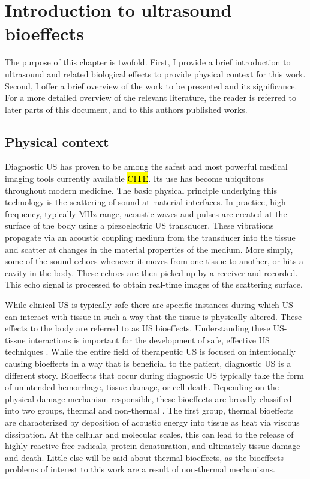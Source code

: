 \chapter{Introduction to ultrasound bioeffects} \label{ch:usbe_intro}%
The purpose of this chapter is twofold. First, I provide a brief
introduction to ultrasound and related biological effects to provide
physical context for this work. Second, I offer a brief overview of
the work to be presented and its significance. For a more detailed
overview of the relevant literature, the reader is referred to later
parts of this document, and to this authors published works.

\section{Physical context} \label{sec:usbe_intro_physical_context}%
Diagnostic \ac{US} has proven to be among the safest and most powerful
medical imaging tools currently available \hl{CITE}. Its use has become
ubiquitous throughout modern medicine. The basic physical principle
underlying this technology is the scattering of sound at material
interfaces. In practice, high-frequency, typically MHz range, acoustic
waves and pulses are created at the surface of the body using a
piezoelectric \ac{US} transducer. These vibrations propagate via an
acoustic coupling medium from the transducer into the tissue and
scatter at changes in the material properties of the medium. More
simply, some of the sound echoes whenever it moves from one tissue to
another, or hits a cavity in the body. These echoes are then picked up
by a receiver and recorded. This echo signal is processed to obtain
real-time images of the scattering surface.

While clinical \ac{US} is typically safe there are specific instances
during which \ac{US} can interact with tissue in such a way that the
tissue is physically altered. These effects to the body are referred
to as \ac{US} bioeffects. Understanding these \ac{US}-tissue
interactions is important for the development of safe, effective
\ac{US} techniques \citep{Dalecki2004}. While the entire field of
therapeutic \ac{US} is focused on intentionally causing bioeffects in
a way that is beneficial to the patient, diagnostic \ac{US} is a
different story. Bioeffects that occur during diagnostic \ac{US}
typically take the form of unintended hemorrhage, tissue damage, or
cell death. Depending on the physical damage mechanism responsible,
these bioeffects are broadly classified into two groups, thermal and
non-thermal \citep{OBrien2007}. The first group, thermal bioeffects
are characterized by deposition of acoustic energy into tissue as heat
via viscous dissipation. At the cellular and molecular scales, this
can lead to the release of highly reactive free radicals, protein
denaturation, and ultimately tissue damage and death. Little else will
be said about thermal bioeffects, as the bioeffects problems of
interest to this work are a result of non-thermal mechanisms.

